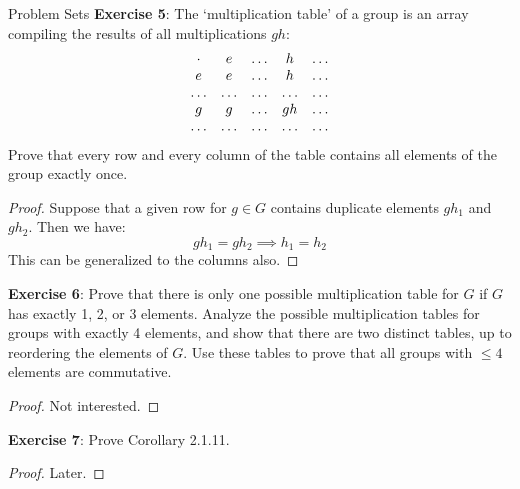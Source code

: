 \documentclass{report}
\begin{document}
\begin{exercises}{Problem Sets}
    \textbf{Exercise 5}: The `multiplication table' of a group is an array compiling the results of all multiplications $gh$:
        \begin{align*}
            \begin{array}{ c c c c c }
                \cdot  & e      & \ldots & h      & \ldots \\
                e      & e      & \ldots & h      & \ldots \\
                \ldots & \ldots & \ldots & \ldots & \ldots \\
                g      & g      & \ldots & gh     & \ldots \\
                \ldots & \ldots & \ldots & \ldots & \ldots   
            \end{array}   
        \end{align*}
    Prove that every row and every column of the table contains all elements of the group exactly once.
        \begin{proof}
            Suppose that a given row for $g \in G$ contains duplicate elements $gh_{1}$ and $gh_{2}$. Then we have:
                \begin{equation*}
                    gh_{1} = gh_{2} \implies h_{1} = h_{2}
                \end{equation*}
            This can be generalized to the columns also.
        \end{proof}

    \textbf{Exercise 6}: Prove that there is only one possible multiplication table for $G$ if $G$ has exactly 1, 2, or 3 elements. Analyze the possible multiplication tables for groups with exactly 4 elements, and show that there are two distinct tables, up to reordering the elements of $G$. Use these tables to prove that all groups with $\leq 4$ elements are commutative.
        \begin{proof}
            Not interested.
        \end{proof}

    \textbf{Exercise 7}: Prove Corollary 2.1.11.
        \begin{proof}
            Later.
        \end{proof}


\end{exercises}
\end{document}

